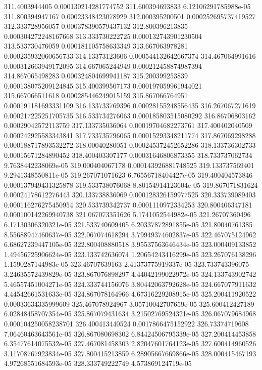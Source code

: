 {311.4003944405 0.000130214281774752
311.600394693833 6.12106291785988e-05
311.800394947167 0.00023348423078929
312.000395200501 0.000252695737419527
312.333728956057 0.000378390579437132
312.800396213835 0.000304272248167668
313.333730222725 0.000132743901230504
313.533730476059 0.000181105758633349
313.667063978281 0.000235932060656733
314.13373123606 0.000544132642667374
314.467064991616 0.000312663949172095
314.667065244949 0.000212458874987394
314.867065498283 0.000324804699941187
315.200399253839 0.000138075209124845
315.400399507173 0.000197059961944021
315.667066511618 0.000285446249015159
315.867066764951 0.000191181693331109
316.133733769396 0.00028155248556435
316.267067271619 0.000217225251705735
316.533734276063 0.000185803515080292
316.86706803162 0.00029042572113759
317.133735036064 0.00019704682273761
317.400402040509 0.000242925583343841
317.733735796065 0.00015293348211774
317.867069298288 0.000188717893532272
318.00040280051 0.000245372452652286
318.133736302733 0.00015671284890452
318.400403307177 0.00031646806873355
318.733737062734 9.7638442238069e-05
319.000404067178 0.000143926881748525
319.133737569401 9.2941348550811e-05
319.267071071623 6.76556718404427e-05
319.400404573846 0.000137949431325878
319.533738076068 8.80154914123604e-05
319.867071831624 0.00024178612276443
320.133738836069 0.000128326159977525
320.333739089403 0.000116276275450954
320.533739342737 0.0001110972334253
320.800406347181 0.000100142269940738
321.067073351626 5.1741052544982e-05
321.26707360496 6.17130306320321e-05
321.533740609405 6.20337872891855e-05
321.80040761385 8.55688947460637e-05
322.067074618294 3.79949374602837e-05
322.467075124962 6.68627239447105e-05
322.800408880518 3.95537563646434e-05
323.000409133852 1.49456725906624e-05
323.133742636074 1.20654243416299e-05
323.267076138296 1.1590287144983e-05
323.46707639163 2.41373775919337e-05
323.733743396075 3.24635572439829e-05
323.867076898297 4.44042199022972e-05
324.133743902742 5.46557451004271e-05
324.333744156076 3.80442063792628e-05
324.667077911632 4.44542661531633e-05
324.867078164966 4.67316229208915e-05
325.200411920522 0.00033634335999609
325.467078924967 3.05710042707659e-05
325.600412427189 6.02848458707354e-05
325.867079431634 3.21502769524321e-05
326.067079684968 0.000104250058238701
326.400413440524 0.0017866475152922
326.73374719608 7.06460463643561e-05
326.867080698302 6.84424506795339e-05
327.200414453858 6.35477614075532e-05
327.467081458303 2.82047601764123e-05
327.600414960526 3.11708767923834e-05
327.800415213859 6.28905667669866e-05
328.000415467193 4.97268551684593e-05
328.333749222749 4.573869124719e-05
}
